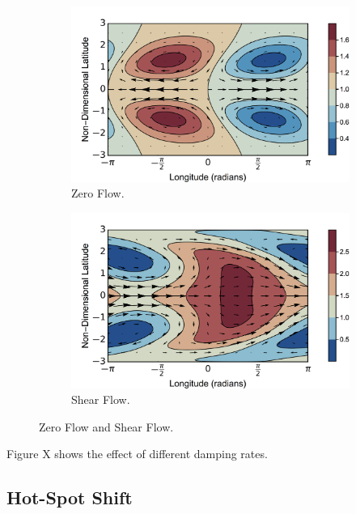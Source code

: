 \begin{figure}
  \centering
  \begin{subfigure}[b]{0.49\textwidth}
    \includegraphics[width=\textwidth]{figures/wave-mean-flow/zero-alpha-dyn-zero-flow.png}
    \caption{Zero Flow.}
    \label{fig:zero-alpha-dyn-zero-flow}
  \end{subfigure}
  \begin{subfigure}[b]{0.49\textwidth}
    \includegraphics[width=\textwidth]{figures/wave-mean-flow/zero-alpha-dyn-1-flow.png}
    \caption{Shear Flow.}
    \label{fig:zero-alpha-dyn-1-flow}
  \end{subfigure}
  \caption{Zero Flow and Shear Flow.}
  \label{fig:zero-alpha-dyn-flow}
\end{figure}


Figure X shows the effect of different damping rates.

\subsection{Hot-Spot Shift}


